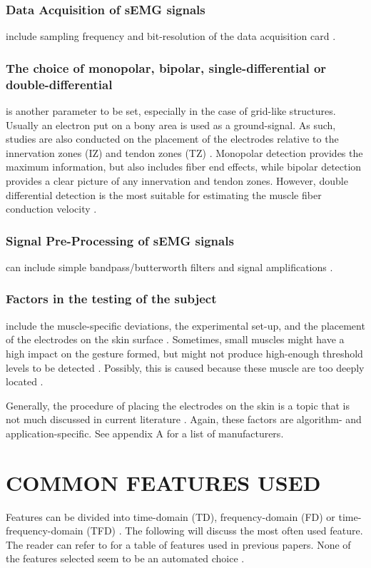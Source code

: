 \documentclass{article}
\begin{document}
\subsubsection{Data Acquisition of sEMG signals} include sampling frequency and bit-resolution of the data acquisition card \cite{Kilby2016}. 
\subsubsection{The choice of monopolar, bipolar, single-differential or double-differential} is another parameter to be set, especially in the case of grid-like structures. Usually an electron put on a bony area is used as a ground-signal. As such, studies are also conducted on the placement of the electrodes relative to the innervation zones (IZ) and tendon zones (TZ) \cite{Beck2009} \cite{Beck2008}. Monopolar detection provides the maximum information, but also includes fiber end effects, while bipolar detection provides a clear picture of any innervation and tendon zones. However, double differential detection is the most suitable for estimating the muscle fiber conduction velocity \cite{Kilby2016}. 
\subsubsection{Signal Pre-Processing of sEMG signals} \cite{Kilby2016} can include simple bandpass/butterworth filters \cite{} and signal amplifications \cite{}.  
\subsubsection{Factors in the testing of the subject} include the muscle-specific deviations, the experimental set-up, and the placement of the electrodes on the skin surface \cite{Kilby2016}. Sometimes, small muscles might have a high impact on the gesture formed, but might not produce high-enough threshold levels to be detected \cite{McIntosh2016}. Possibly, this is caused because these muscle are too deeply located \cite{El-Khoury2015}.

Generally, the procedure of placing the electrodes on the skin is a topic that is not much discussed in current literature \cite{Kilby2016} \cite{Ghapanchizadeh2017}. Again, these factors are algorithm- and application-specific. See appendix A for a list of manufacturers.


\section{COMMON FEATURES USED \cite{Nazmi2016}}
Features can be divided into time-domain (TD), frequency-domain (FD) or time-frequency-domain (TFD) \cite{Tsai2014} \cite{Hogan1980} \cite{Englehart1999} \cite{Nazmi2016}. The following will discuss the most often used feature. The reader can refer to \cite{Nazmi2016} for a table of features used in previous papers. None of the features selected seem to be an automated choice \cite{Nazmi2016}.
\end{document}
